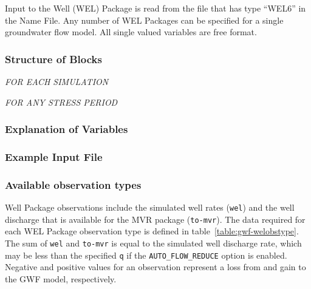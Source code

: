 Input to the Well (WEL) Package is read from the file that has type ``WEL6'' in the Name File.  Any number of WEL Packages can be specified for a single groundwater flow model.  All single valued variables are free format.

\vspace{5mm}
\subsubsection{Structure of Blocks}
\vspace{5mm}

\noindent \textit{FOR EACH SIMULATION}


\vspace{5mm}
\noindent \textit{FOR ANY STRESS PERIOD}


\vspace{5mm}
\subsubsection{Explanation of Variables}
\begin{description}

\end{description}

\vspace{5mm}
\subsubsection{Example Input File}


\vspace{5mm}
\subsubsection{Available observation types}
Well Package observations include the simulated well rates (\texttt{wel}) and the well discharge that is available for the MVR package (\texttt{to-mvr}). The data required for each WEL Package observation type is defined in table~\ref{table:gwf-welobstype}. The sum of \texttt{wel} and \texttt{to-mvr} is equal to the simulated well discharge rate, which may be less than the specified \texttt{q} if the \texttt{AUTO\_FLOW\_REDUCE} option is enabled. Negative and positive values for an observation represent a loss from and gain to the GWF model, respectively.

